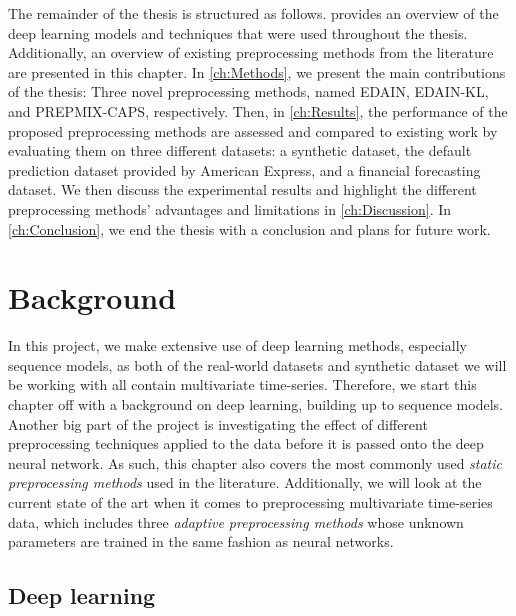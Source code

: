 \documentclass{statsmsc}
\begin{document}
{%
The remainder of the thesis is structured as follows. 
provides an overview of the deep learning models and techniques that were used
throughout the thesis. Additionally, an overview of existing preprocessing
methods from the literature are presented in this chapter. In
\cref{ch:Methods}, we present the main contributions of the thesis: Three novel
preprocessing methods, named \acs{EDAIN}, \acs{EDAIN-KL}, and \acs{PREPMIX-CAPS},
respectively. Then, in \cref{ch:Results}, the performance of the
proposed preprocessing methods are assessed and compared to existing work by
evaluating them on three different datasets: a synthetic dataset, the default
prediction dataset provided by American Express, and a financial forecasting
dataset. We then discuss the experimental results and highlight the different
preprocessing methods' advantages and limitations in \cref{ch:Discussion}.  In
\cref{ch:Conclusion}, we end the thesis with a conclusion and plans for future
work.


\chapter{Background} %
\label{ch:Background}


In this project, we make extensive use of deep learning methods, especially sequence models, as
both of the real-world datasets and synthetic dataset we will be working with all contain
multivariate time-series.  Therefore, we start this chapter off with a background on deep
learning, building up to sequence models.
Another big part of the project is investigating the effect of different
preprocessing techniques applied to the data before it is passed onto the deep neural network.
As such, this chapter also covers the most commonly used \textit{static preprocessing methods} used
in the literature. Additionally, we will look at the current state of the art when it comes
to preprocessing multivariate time-series data, which includes three
\textit{adaptive preprocessing methods} whose unknown parameters are trained in the same
fashion as neural networks.


\section{Deep learning}%
\label{sec:Deep learning}

}
\end{document}
